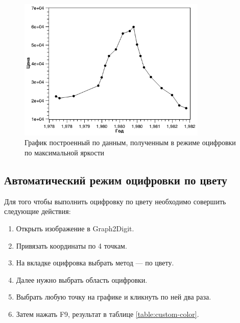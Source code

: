 \documentclass[a4paper,14pt,russian]{report}
\begin{document}
\begin{figure}[!htb]
  \centerline{\includegraphics[width=0.8\textwidth]{graph-custom-brightness}}
  \caption{График построенный по данным, полученным в режиме оцифровки по максимальной яркости}
  \label{graph:custom-brightness}
\end{figure}

\subsection{Автоматический режим оцифровки по цвету}

Для того чтобы выполнить оцифровку по цвету необходимо совершить следующие действия:

\begin{enumerate}
  \item Открыть изображение в Graph2Digit.
  \item Привязать координаты по 4 точкам.
  \item На вкладке оцифровка выбрать метод — по цвету.
  \item Далее нужно выбрать область оцифровки.
  \item Выбрать любую точку на графике и кликнуть по ней два раза.
  \item Затем нажать F9, результат в таблице \ref{table:custom-color}.
\end{enumerate}
\end{document}
